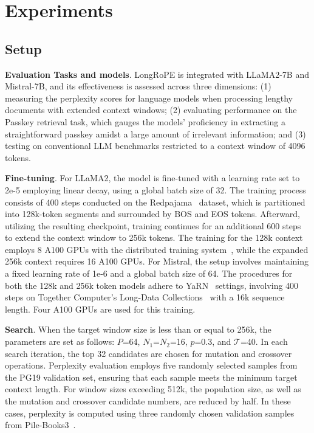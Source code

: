  \section{Experiments}

\label{sec:exp}
\subsection{Setup}
\textbf{Evaluation Tasks and models}. LongRoPE is integrated with LLaMA2-7B and Mistral-7B, and its effectiveness is assessed across three dimensions: (1) measuring the perplexity scores for language models when processing lengthy documents with extended context windows; (2) evaluating performance on the Passkey retrieval task, which gauges the models' proficiency in extracting a straightforward passkey amidst a large amount of irrelevant information; and (3) testing on conventional LLM benchmarks restricted to a context window of 4096 tokens.

\textbf{Fine-tuning}. For LLaMA2, the model is fine-tuned with a learning rate set to 2e-5 employing linear decay, using a global batch size of 32. The training process consists of 400 steps conducted on the Redpajama~\cite{redpajama} dataset, which is partitioned into 128k-token segments and surrounded by BOS and EOS tokens. Afterward, utilizing the resulting checkpoint, training continues for an additional 600 steps to extend the context window to 256k tokens. The training for the 128k context employs 8 A100 GPUs with the distributed training system~\cite{cube}, while the expanded 256k context requires 16 A100 GPUs. For Mistral, the setup involves maintaining a fixed learning rate of 1e-6 and a global batch size of 64. The procedures for both the 128k and 256k token models adhere to YaRN~\cite{yarn} settings, involving 400 steps on Together Computer's Long-Data Collections~\cite{mistraldata} with a 16k sequence length. Four A100 GPUs are used for this training.

\textbf{Search}. When the target window size is less than or equal to 256k, the parameters are set as follows: $P$=64, $N_1$=$N_2$=16, $p$=0.3, and $\mathcal{T}$=40. In each search iteration, the top 32 candidates are chosen for mutation and crossover operations. Perplexity evaluation employs five randomly selected samples from the PG19 validation set, ensuring that each sample meets the minimum target context length. For window sizes exceeding 512k, the population size, as well as the mutation and crossover candidate numbers, are reduced by half. In these cases, perplexity is computed using three randomly chosen validation samples from Pile-Books3~\cite{pile}.


